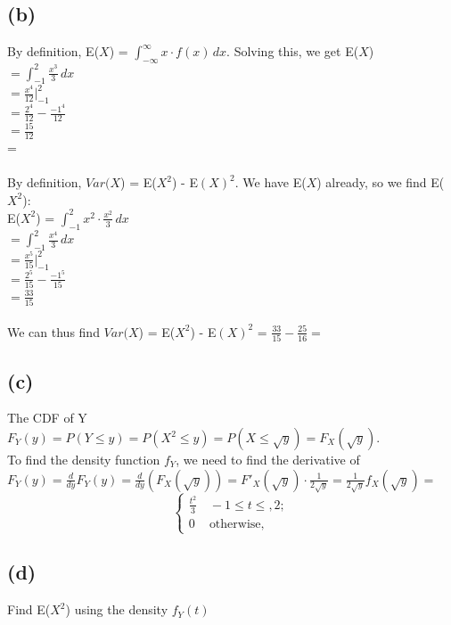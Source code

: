 \documentclass{article}
\begin{document}
{\subsection*{(b)}
By definition, E($X$) = $\int_{-\infty}^{\infty}x \cdot f(x) \,dx$. Solving this, we get E($X$)  \\ 
$ = \int_{-1}^{2} \frac{x^3}{3} \,dx$ \\ 
$ = \frac{x^4}{12} |_{-1}^{2}$ \\ 
$ = \frac{2^4}{12} - \frac{-1^4}{12}$ \\ 
$ = \frac{15}{12}$ \\
=  \\ \\
By definition, $Var(X$) = E($X^2$) - E$(X)^2$. We have E($X$) already, so we find E($X^2$): \\ 
E($X^2$) = $ \int_{-1}^{2} x^2 \cdot \frac{x^2}{3} \,dx$ \\ 
$ = \int_{-1}^{2} \frac{x^4}{3} \,dx$ \\
$ = \frac{x^5}{15} |_{-1}^{2}$ \\
$ = \frac{2^5}{15} - \frac{-1^5}{15}$ \\
$ = \frac{33}{15}$ \\ \\ 
We can thus find $Var(X$) = E($X^2$) - E$(X)^2$ = $\frac{33}{15} - \frac{25}{16} = $  

\subsection*{(c)}
The CDF of Y $F_Y(y) = P(Y \leq y) = P(X^2 \leq y) = P(X \leq \sqrt{y}) = F_X(\sqrt{y})$. \\
To find the density function $f_Y$, we need to find the derivative of $F_Y(y) = \frac{d}{dy}F_Y(y) = \frac{d}{dy}(F_X(\sqrt{y})) = {F'}_X(\sqrt{y}) \cdot \frac{1}{2\sqrt{y}} = \frac{1}{2\sqrt{y}}f_X(\sqrt{y}) = \frac{}{}$
\[
\begin{cases}
\frac{t^2}{3} & \,-1\le t\le,2;\\
0 & \,\mbox{otherwise,}
\end{cases}
\]

\subsection*{(d)}
Find E($X^2$) using the density $f_Y(t)$

}
\end{document}
